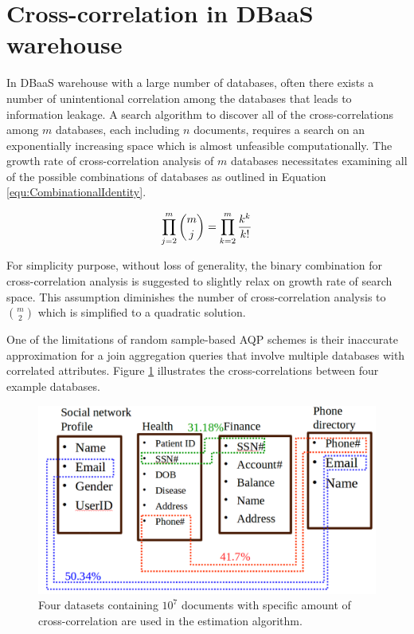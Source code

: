 \section{Cross-correlation in DBaaS warehouse}
\label{DBaaSCrossCorrelationSection}

In DBaaS warehouse with a large number of databases, often there exists a number of unintentional correlation among the databases that leads to information leakage. A search algorithm to discover all of the cross-correlations among $m$ databases, each including $n$ documents, requires a search on an exponentially increasing space which is almost unfeasible computationally. The growth rate of cross-correlation analysis of $m$ databases necessitates examining all of the possible combinations of databases as outlined in Equation \ref{equ:CombinationalIdentity}.

\begin{equation}
\label{equ:CombinationalIdentity}
\begin{aligned}
\prod_{j=2}^m {m\choose j} =\prod_{k=2}^m {k^k\over k!}
\end{aligned}
\end{equation}

For simplicity purpose, without loss of generality, the binary combination for cross-correlation analysis is suggested to slightly relax on growth rate of search space. This assumption diminishes the number of cross-correlation analysis to $m\choose 2$ which is simplified to a quadratic solution.

One of the limitations of random sample-based AQP schemes is their inaccurate approximation for a join aggregation queries that involve multiple databases with correlated attributes. Figure \ref{fig:cross-correlationMap} illustrates the cross-correlations between four example databases. 

\begin{figure}[H]
\centering
\includegraphics[width=0.7\linewidth]{figures/cross-correlationMap}
\caption[Cross-correlation map]{Four datasets containing $10^7$ documents with specific amount of cross-correlation are used in the estimation algorithm.}
\label{fig:cross-correlationMap}
\end{figure}

